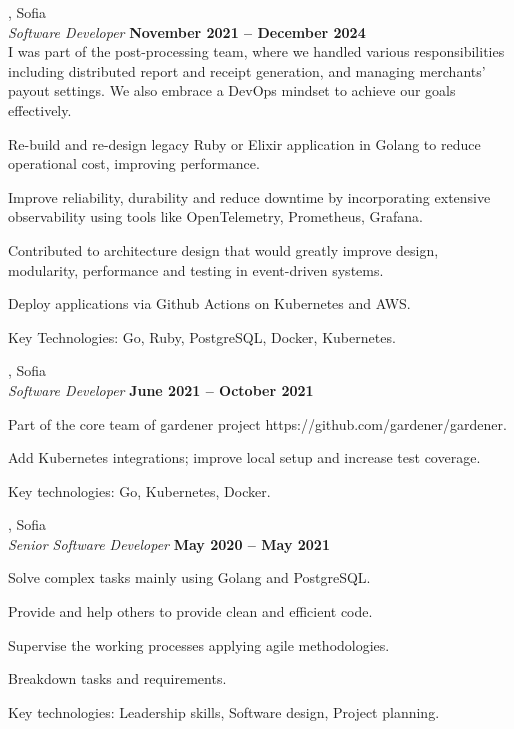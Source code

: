 \documentclass[margin,line]{resume}
\begin{document}
\begin{resume}
    \textbf{}, Sofia \vspace{2mm}\\\vspace{1mm}%
    \textsl{Software Developer} \hfill \textbf{November 2021 {--} December 2024}\\
	I was part of the post-processing team, where we handled various
	responsibilities including distributed report and receipt generation, and managing
	merchants' payout settings. We also embrace a DevOps mindset to achieve our
	goals effectively.\\
    \begin{list2}
        \item Re-build and re-design legacy Ruby or Elixir application in Golang to reduce operational cost, improving performance.\@
		\item Improve reliability, durability and reduce downtime by
			incorporating extensive observability using tools like
			OpenTelemetry, Prometheus, Grafana.
        \item Contributed to architecture design that would greatly improve design, modularity, performance and testing in event-driven systems.
		\item Deploy applications via Github Actions on Kubernetes and AWS.
		\item Key Technologies: Go, Ruby, PostgreSQL, Docker, Kubernetes.
    \end{list2}

    \textbf{}, Sofia \vspace{2mm}\\\vspace{1mm}%
    \textsl{Software Developer} \hfill \textbf{June 2021 {--} October 2021}\
    \begin{list2}
		\item Part of the core team of gardener project https://github.com/gardener/gardener.\@
		\item Add Kubernetes integrations; improve local setup and increase test coverage.
        \item Key technologies: Go, Kubernetes, Docker.
    \end{list2}

    \textbf{}, Sofia \vspace{2mm}\\\vspace{1mm}%
    \textsl{Senior Software Developer} \hfill \textbf{May 2020 {--} May 2021}\
    \begin{list2}
        \item Solve complex tasks mainly using Golang and PostgreSQL.\@
        \item Provide and help others to provide clean and efficient code.
		\item Supervise the working processes applying agile methodologies.
        \item Breakdown tasks and requirements.
		\item Key technologies: Leadership skills, Software design, Project planning.
    \end{list2}


\end{resume}
\end{document}
